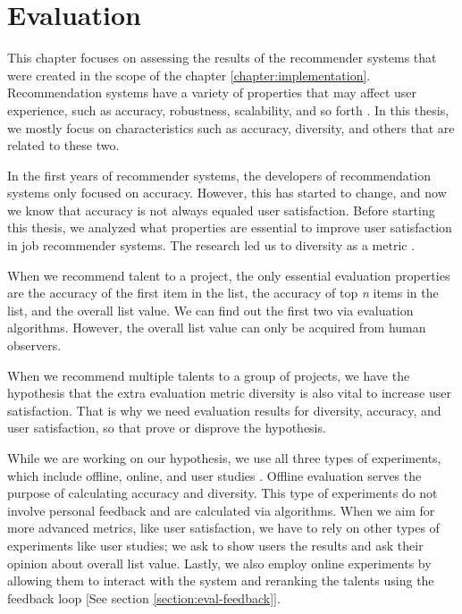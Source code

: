 
\chapter{Evaluation}\label{chapter:evaluation}

This chapter focuses on assessing the results of the recommender systems that were created in the scope of the chapter \ref{chapter:implementation}. Recommendation systems have a variety of properties that may affect user experience, such as accuracy, robustness, scalability, and so forth \cite{shani2011evaluating}. In this thesis, we mostly focus on characteristics such as accuracy, diversity, and others that are related to these two. 

In the first years of recommender systems, the developers of recommendation systems only focused on accuracy. However, this has started to change, and now we know that accuracy is not always equaled user satisfaction. Before starting this thesis, we analyzed what properties are essential to improve user satisfaction in job recommender systems. The research led us to diversity as a metric \cite{castells2015novelty}.

When we recommend talent to a project, the only essential evaluation properties are the accuracy of the first item in the list, the accuracy of top \textit{n} items in the list, and the overall list value. We can find out the first two via evaluation algorithms. However, the overall list value can only be acquired from human observers. 

When we recommend multiple talents to a group of projects, we have the hypothesis that the extra evaluation metric diversity is also vital to increase user satisfaction. That is why we need evaluation results for diversity, accuracy, and user satisfaction, so that prove or disprove the hypothesis. 

While we are working on our hypothesis, we use all three types of experiments, which include offline, online, and user studies \cite{shani2011evaluating}. Offline evaluation serves the purpose of calculating accuracy and diversity. This type of experiments do not involve personal feedback and are calculated via algorithms. When we aim for more advanced metrics, like user satisfaction, we have to rely on other types of experiments like user studies; we ask to show users the results and ask their opinion about overall list value. Lastly, we also employ online experiments by allowing them to interact with the system and reranking the talents using the feedback loop [See section \ref{section:eval-feedback}]. 

